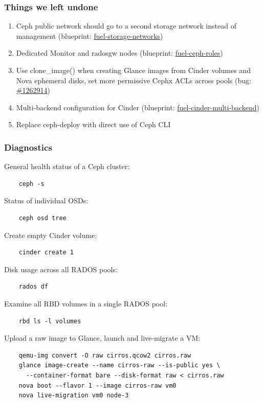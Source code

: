 \documentclass[hyperref=unicode,utf8,xcolor=pst,aspectratio=169]{beamer}
\begin{document}
\begin{frame}
	\frametitle{Things we left undone}
	\begin{enumerate}
		\item Ceph public network should go to a second storage
			network instead of management (blueprint:
			\href{https://blueprints.launchpad.net/fuel/+spec/fuel-storage-networks}{fuel-storage-networks})
		\item Dedicated Monitor and radosgw nodes (blueprint:
			\href{https://blueprints.launchpad.net/fuel/+spec/fuel-ceph-roles}{fuel-ceph-roles})
		\item Use clone\_image() when creating Glance images from
			Cinder volumes and Nova ephemeral disks, set more
			permissive Cephx ACLs across pools (bug: 
			\href{https://bugs.launchpad.net/fuel/+bug/1262914}{\#1262914})
		\item Multi-backend configuration for Cinder (blueprint:
			\href{https://blueprints.launchpad.net/fuel/+spec/fuel-cinder-multi-backend}{fuel-cinder-multi-backend})
		\item Replace ceph-deploy with direct use of Ceph CLI
	\end{enumerate}
\end{frame}

\begin{frame}[fragile]
	\frametitle{Diagnostics}
	\lstset{language=bash,basicstyle=\ttfamily\footnotesize}

	General health status of a Ceph cluster:
	\vspace{-2mm}
	\begin{lstlisting}
	ceph -s
	\end{lstlisting}

	Status of individual OSDs:
	\vspace{-2mm}
	\begin{lstlisting}
	ceph osd tree
	\end{lstlisting}

	Create empty Cinder volume:
	\vspace{-2mm}
	\begin{lstlisting}
	cinder create 1
	\end{lstlisting}

	Disk usage across all RADOS pools:
	\vspace{-2mm}
	\begin{lstlisting}
	rados df
	\end{lstlisting}

	Examine all RBD volumes in a single RADOS pool:
	\vspace{-2mm}
	\begin{lstlisting}
	rbd ls -l volumes
	\end{lstlisting}

	Upload a raw image to Glance, launch and live-migrate a VM:
	\vspace{-2mm}
	\begin{lstlisting}
	qemu-img convert -O raw cirros.qcow2 cirros.raw
	glance image-create --name cirros-raw --is-public yes \
	  --container-format bare --disk-format raw < cirros.raw
	nova boot --flavor 1 --image cirros-raw vm0
	nova live-migration vm0 node-3
	\end{lstlisting}
\end{frame}
\end{document}
